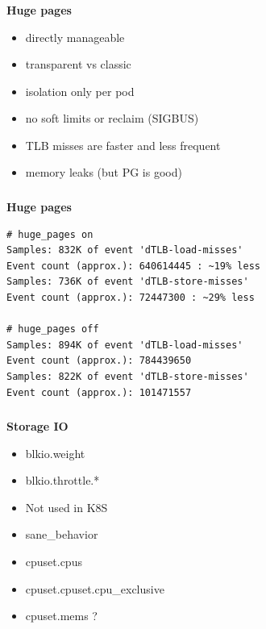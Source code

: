 \documentclass[usenames,dvipsnames, 18pt, compress, aspectratio=169]{beamer}
\begin{document}
\begin{frame}[fragile]{}
    \frametitle{}
    \begin{center}
        \textbf{Huge pages}

        \begin{itemize}[]
			\item directly manageable
            \item transparent vs classic
            \item isolation only per pod
			\item no soft limits or reclaim (SIGBUS)
			\item TLB misses are faster and less frequent
            \item memory leaks (but PG is good)
        \end{itemize}

    \end{center}
\end{frame}

\begin{frame}[fragile]{}
    \frametitle{}
    \begin{center}
        \textbf{Huge pages}

        \begin{flushleft}
		\begin{verbatim}
# huge_pages on
Samples: 832K of event 'dTLB-load-misses'
Event count (approx.): 640614445 : ~19% less
Samples: 736K of event 'dTLB-store-misses'
Event count (approx.): 72447300 : ~29% less

# huge_pages off
Samples: 894K of event 'dTLB-load-misses'
Event count (approx.): 784439650
Samples: 822K of event 'dTLB-store-misses'
Event count (approx.): 101471557
        \end{verbatim}
        \end{flushleft}

    \end{center}
\end{frame}

\begin{frame}[fragile]{}
    \frametitle{}
    \begin{center}
        \textbf{Storage IO}

        \begin{itemize}[]
            \item blkio.weight
            \item blkio.throttle.*
			\item Not used in K8S
			\item sane\_behavior
            \item cpuset.cpus
            \item cpuset.cpuset.cpu\_exclusive
            \item cpuset.mems ?
        \end{itemize}

    \end{center}
\end{frame}
\end{document}
